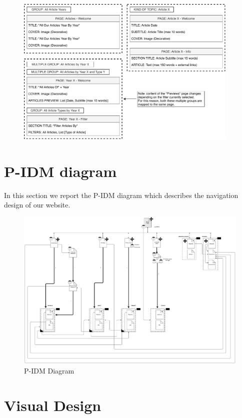 \documentclass[12pt]{report}
\begin{document}
\begin{figure}[h]
	\centering
	\includegraphics[width=0.95\textwidth]{page_mapping_pt3.pdf}
\end{figure}

\chapter{P-IDM diagram}
In this section we report the P-IDM diagram which describes the navigation design of our website.\\
\begin{figure}[h]
	\centering
	\includegraphics[width=\textwidth]{P-IDM.pdf}
	\caption{P-IDM Diagram}
\end{figure}

\chapter{Visual Design}
\end{document}
